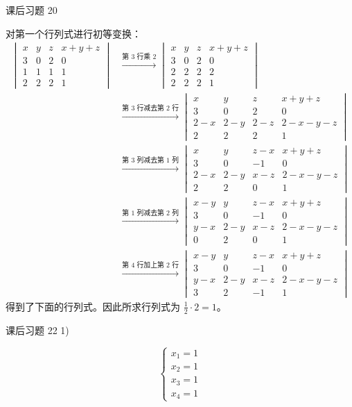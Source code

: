 \begin{problem}
	课后习题 20
	\begin{solution}
		对第一个行列式进行初等变换：
		$$
		\begin{aligned}
			\begin{vmatrix}
				x & y & z & x + y + z \\
				3 & 0 & 2 & 0 \\
				1 & 1 & 1 & 1 \\
				2 & 2 & 2 & 1
			\end{vmatrix} & \xrightarrow{\text{第 $3$ 行乘 $2$}} \begin{vmatrix}
				x & y & z & x + y + z \\
				3 & 0 & 2 & 0 \\
				2 & 2 & 2 & 2 \\
				2 & 2 & 2 & 1
			\end{vmatrix} \\
			& \xrightarrow{\text{第 $3$ 行减去第 $2$ 行}} \begin{vmatrix}
				x & y & z & x + y + z \\
				3 & 0 & 2 & 0 \\
				2 - x & 2 - y & 2 - z & 2 - x - y - z \\
				2 & 2 & 2 & 1
			\end{vmatrix} \\
			& \xrightarrow{\text{第 $3$ 列减去第 $1$ 列}} \begin{vmatrix}
				x & y & z - x & x + y + z \\
				3 & 0 & -1 & 0 \\
				2 - x & 2 - y & x - z & 2 - x - y - z \\
				2 & 2 & 0 & 1
			\end{vmatrix} \\
			& \xrightarrow{\text{第 $1$ 列减去第 $2$ 列}} \begin{vmatrix}
				x - y & y & z - x & x + y + z \\
				3 & 0 & -1 & 0 \\
				y - x & 2 - y & x - z & 2 - x - y - z \\
				0 & 2 & 0 & 1
			\end{vmatrix} \\
			& \xrightarrow{\text{第 $4$ 行加上第 $2$ 行}} \begin{vmatrix}
				x - y & y & z - x & x + y + z \\
				3 & 0 & -1 & 0 \\
				y - x & 2 - y & x - z & 2 - x - y - z \\
				3 & 2 & -1 & 1
			\end{vmatrix}
		\end{aligned}
		$$
		得到了下面的行列式。因此所求行列式为 $\frac{1}{2} \cdot 2 = 1$。
	\end{solution}
\end{problem}

\begin{problem}
	课后习题 22 1)
	\begin{solution}
		$$
		\begin{cases}
			x_1 = 1 \\
			x_2 = 1 \\
			x_3 = 1 \\
			x_4 = 1
		\end{cases}
		$$
	\end{solution}
\end{problem}
